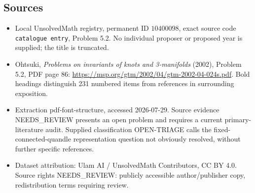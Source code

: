 \documentclass[11pt]{article}
\begin{document}
\subsection{Sources}
\begin{itemize}
\item Local UnsolvedMath registry, permanent ID \(10400098\), exact source code \texttt{catalogue entry}, Problem 5.2. No individual proposer or proposed year is supplied; the title is truncated.
\item Ohtsuki, \emph{Problems on invariants of knots and 3-manifolds} (2002), Problem 5.2, PDF page 86: \url{https://msp.org/gtm/2002/04/gtm-2002-04-024s.pdf}. Bold headings distinguish 231 numbered items from references in surrounding exposition.
\item Extraction pdf-font-structure, accessed 2026-07-29. Source evidence NEEDS\_REVIEW presents an open problem and requires a current primary-literature audit. Supplied classification OPEN-TRIAGE calls the fixed-connected-quandle representation question not obviously resolved, without further specific references.
\item Dataset attribution: Ulam AI / UnsolvedMath Contributors, CC BY 4.0. Source rights NEEDS\_REVIEW: publicly accessible author/publisher copy, redistribution terms requiring review.
\end{itemize}
\end{document}
